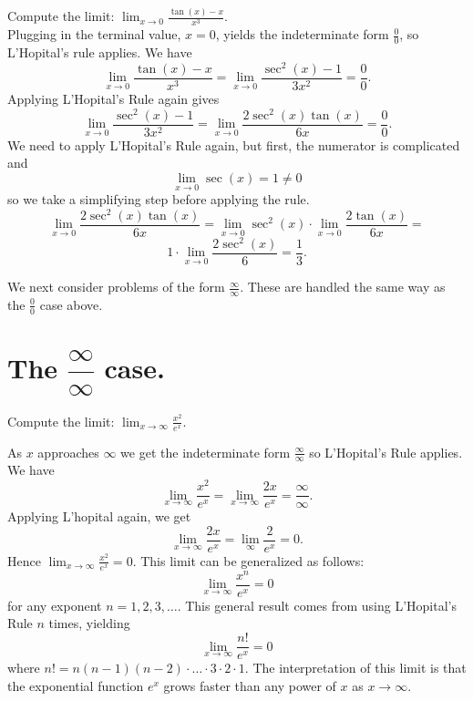 \documentclass{ximera}
\begin{document}
\begin{example}[example 5]
Compute the limit: \quad $\displaystyle{\lim_{x \to 0} \frac{\tan(x)-x}{x^3}}.$\\
Plugging in the terminal value, $x=0$, yields 
the indeterminate form $\frac00$, so L'Hopital's rule applies.
We have 
\[\lim_{x \to 0} \frac{\tan(x)-x}{x^3} = \lim_{x \to 0} \frac{\sec^2(x)-1}{3x^2} = \frac{0}{0}.\]
Applying L'Hopital's Rule again gives
\[\lim_{x \to 0} \frac{\sec^2(x)-1}{3x^2} = \lim_{x \to 0} \frac{2\sec^2(x)\tan(x)}{6x} = \frac{0}{0}.\]	
We need to apply L'Hopital's Rule again, but first, the numerator is complicated and 								
\[\lim_{x \to 0} \sec(x) = 1 \neq 0\]
so we take a simplifying step before applying the rule.
\[\lim_{x \to 0} \frac{2\sec^2(x)\tan(x)}{6x} = 
\lim_{x \to 0} \sec^2(x) \cdot \lim_{x \to 0} \frac{2\tan(x)}{6x}=\]
 \[1\cdot \lim_{x \to 0} \frac{2\sec^2(x)}{6} =\frac{1}{3}.\]
\end{example}


We next consider problems of the form $\frac{\infty}{\infty}$.  These are handled the same way as the $\frac00$ case above.



\section{ The $\dfrac{\infty}{\infty}$ case.}



\begin{example}[example 6]
Compute the limit: \quad $\displaystyle{\lim_{x \to \infty} \frac{x^2}{e^x}}.$

As $x$ approaches $\infty$ we get the indeterminate form $\frac{\infty}{\infty}$ so L'Hopital's Rule applies.
We have 
\[\lim_{x\to \infty} \frac{x^2}{e^x} = \lim_{x \to \infty} \frac{2x}{e^x} = \frac{\infty}{\infty}.\]
Applying L'hopital again, we get
\[\lim_{x \to \infty} \frac{2x}{e^x} = \lim_{\infty} \frac{2}{e^x} = 0.\]
Hence $\lim_{x\to\infty}\frac{x^2}{e^x}=0$.  
This limit can be generalized as follows:
\[\lim_{x\to\infty}\frac{x^n}{e^x} =0\]
for any exponent $n = 1, 2, 3, \dots$.
This general result comes from using L'Hopital's Rule $n$ times, yielding
\[\lim_{x\to\infty} \frac{n!}{e^x} =0\]
where $n! = n(n-1)(n-2)\cdot \dots \cdot 3\cdot 2\cdot 1$.
The interpretation of this limit is that the exponential function $e^x$ grows faster than any power of $x$ as $x \to \infty$.
\end{example}
\end{document}
